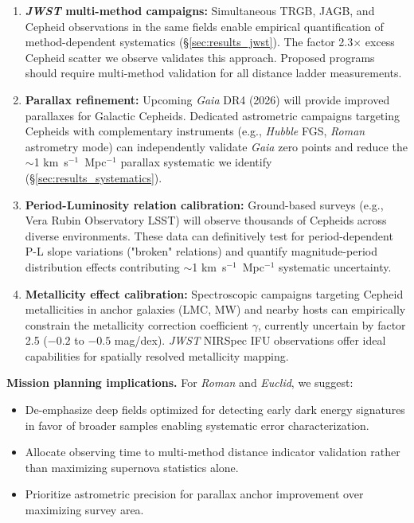\documentclass[twocolumn, linenumbers]{aastex701}
\begin{document}
\begin{enumerate}
\item \textbf{\textit{JWST} multi-method campaigns:} Simultaneous TRGB, JAGB, and Cepheid observations in the same fields enable empirical quantification of method-dependent systematics (\S\ref{sec:results_jwst}). The factor 2.3$\times$ excess Cepheid scatter we observe validates this approach. Proposed programs should require multi-method validation for all distance ladder measurements.

\item \textbf{Parallax refinement:} Upcoming \textit{Gaia} DR4 (2026) will provide improved parallaxes for Galactic Cepheids. Dedicated astrometric campaigns targeting Cepheids with complementary instruments (e.g., \textit{Hubble} FGS, \textit{Roman} astrometry mode) can independently validate \textit{Gaia} zero points and reduce the $\sim$1 km~s$^{-1}$~Mpc$^{-1}$ parallax systematic we identify (\S\ref{sec:results_systematics}).

\item \textbf{Period-Luminosity relation calibration:} Ground-based surveys (e.g., Vera Rubin Observatory LSST) will observe thousands of Cepheids across diverse environments. These data can definitively test for period-dependent P-L slope variations ("broken" relations) and quantify magnitude-period distribution effects contributing $\sim$1 km~s$^{-1}$~Mpc$^{-1}$ systematic uncertainty.

\item \textbf{Metallicity effect calibration:} Spectroscopic campaigns targeting Cepheid metallicities in anchor galaxies (LMC, MW) and nearby hosts can empirically constrain the metallicity correction coefficient $\gamma$, currently uncertain by factor 2.5 ($-0.2$ to $-0.5$ mag/dex). \textit{JWST} NIRSpec IFU observations offer ideal capabilities for spatially resolved metallicity mapping.
\end{enumerate}

\textbf{Mission planning implications.} For \textit{Roman} and \textit{Euclid}, we suggest:
\begin{itemize}
\item De-emphasize deep fields optimized for detecting early dark energy signatures in favor of broader samples enabling systematic error characterization.
\item Allocate observing time to multi-method distance indicator validation rather than maximizing supernova statistics alone.
\item Prioritize astrometric precision for parallax anchor improvement over maximizing survey area.
\end{itemize}
\end{document}
